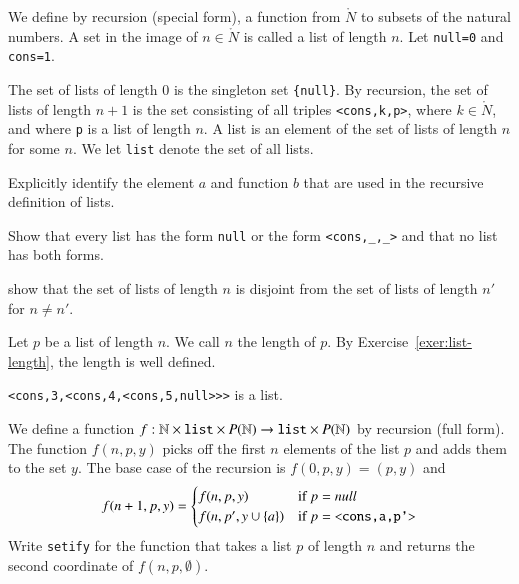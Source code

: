 We define by recursion (special form), a function from $\ring{N}$ to subsets of the natural numbers.  A set in the image of $n\in\ring{N}$ is called a list of length $n$.  Let \verb!null=0! and \verb!cons=1!.

\begin{definition}
The set of lists of length $0$ is the singleton set \verb!{null}!.  By recursion, the set of  lists of length $n+1$ is the set
consisting of all  triples \verb!<cons,k,p>!, where $k\in\ring{N}$, and where \verb!p! is a  list of length $n$.   A  list is an element of the set of  lists of length $n$ for some $n$.  We let \verb!list! denote the set of all  lists.
\end{definition}

\begin{exer} Explicitly identify the element $a$ and function $b$ that are used in the recursive definition of  lists.
\end{exer}

\begin{exer} Show that every list has the form \verb!null! or the form \verb!<cons,_,_>! and that no list has both forms.
\end{exer}

\begin{exer}\label{exer:list-length} show that the set of  lists of length $n$ is disjoint from the set of  lists of length $n'$ for $n\ne n'$.
\end{exer}

\begin{definition} Let $p$ be a  list of length $n$.  We call $n$ the length of $p$.  By Exercise~\ref{exer:list-length}, the length is well defined.
\end{definition}


\begin{example}
\verb!<cons,3,<cons,4,<cons,5,null>>>!
is a  list.
\end{example}

\begin{definition}[setify]
We define a function $f:\ring{N}\times \verb!list!\times P(\ring{N})\to \verb!list!\times P(\ring{N})$ by recursion (full form).  The function $f(n,p,y)$ picks off the first $n$ elements of the  list $p$ and adds them to the set $y$.  The base case of the recursion is $f(0,p,y) = (p,y)$ and
$$
f(n+1,p,y) = \begin{cases} f(n,p,y) & \hbox{if } p = null\\
                f(n,p',y\cup\{a\}) & \hbox{if } p = \verb!<cons,a,p'>!\\
\end{cases}
$$
Write \verb!setify! for the function that takes a  list $p$
of length $n$ and returns the second coordinate of $f(n,p,\emptyset)$.
\end{definition}

